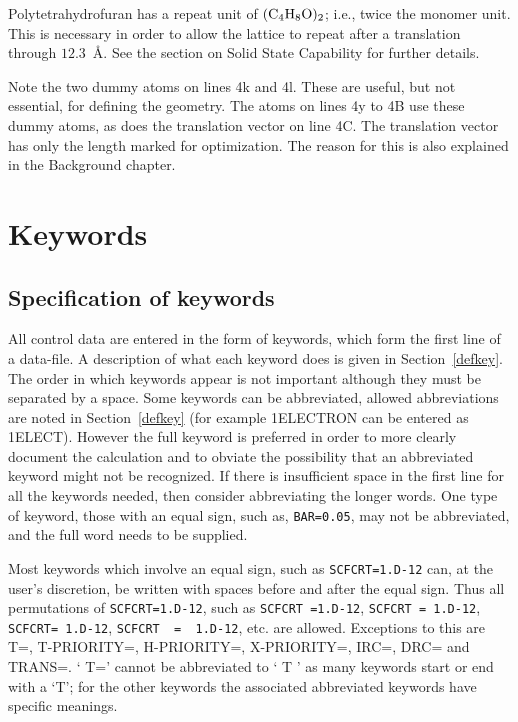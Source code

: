 \documentclass[a4paper]{book}
\def\chem{\rm\everymath={\rm}}
\begin{document}
 Polytetrahydrofuran has a repeat unit of $\chem (C_4H_8O)_2$; i.e.,
 twice  the  monomer  unit.   This is necessary in order to allow the
 lattice to repeat after a translation through $12.3$~\AA.   See
 the section on Solid State Capability for further details.

      Note the two dummy atoms on lines 4k and 4l.  These are useful,
 but not essential, for defining the geometry.  The atoms on lines 4y
 to 4B use these dummy atoms, as does the translation vector on  line
 4C.    The  translation  vector  has  only  the  length  marked  for
 optimization.   The  reason  for  this  is  also  explained  in  the
 Background chapter.
\chapter{Keywords}
\section{Specification of keywords}
All control data are entered in the form of keywords, which form the
 first  line  of  a data-file.  A description of what each keyword does is
 given in Section~\ref{defkey}. The order in which keywords  appear is not
 important  although they must be separated by a space.  Some keywords can
 be abbreviated, allowed abbreviations are noted in Section~\ref{defkey} 
 (for
 example 1ELECTRON can be entered as 1ELECT).  However the full keyword is
 preferred in order to  more  clearly  document  the  calculation  and  to
 obviate  the  possibility  that  an  abbreviated  keyword  might  not  be
 recognized.  If there is insufficient space in the first line for all the
 keywords  needed,  then consider abbreviating the longer words.  One type
 of keyword, those with an equal sign, such as, \verb/BAR=0.05/,  may  not  be
 abbreviated, and the full word needs to be supplied.

 Most keywords which involve an equal sign, such as \verb/SCFCRT=1.D-12/
 can,  at  the  user's discretion, be written with spaces before and after
 the  equal  sign.   Thus  all  permutations  of  \verb/SCFCRT=1.D-12/,  
 such  as \verb/SCFCRT =1.D-12/, \verb/SCFCRT = 1.D-12/, 
 \verb/SCFCRT= 1.D-12/, \verb/SCFCRT  =  1.D-12/, etc.
 are allowed.   Exceptions  to  this  are  T=,  T-PRIORITY=,  H-PRIORITY=,
 X-PRIORITY=, IRC=, DRC= and TRANS=.  ` T=' cannot be abbreviated to ` T '
 as many keywords start or end with a `T';  for  the  other  keywords  the
 associated abbreviated keywords have specific meanings.
\end{document}
